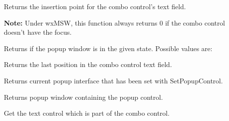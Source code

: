\label{wxcomboctrlgetinsertionpoint}


Returns the insertion point for the combo control's text field.

\textbf{Note:} Under wxMSW, this function always returns $0$ if the combo control
doesn't have the focus.


\label{wxcomboctrlispopupwindowstate}


Returns \true if the popup window is in the given state.
Possible values are:
\twocolwidtha{8cm}%
\begin{twocollist}\itemsep=0pt
\end{twocollist}



\label{wxcomboctrlgetlastposition}


Returns the last position in the combo control text field.


\label{wxcomboctrlgetpopupcontrol}


Returns current popup interface that has been set with SetPopupControl.


\label{wxcomboctrlgetpopupwindow}


Returns popup window containing the popup control.


\label{wxcomboctrlgettextctrl}


Get the text control which is part of the combo control.


\label{wxcomboctrlgettextindent}


